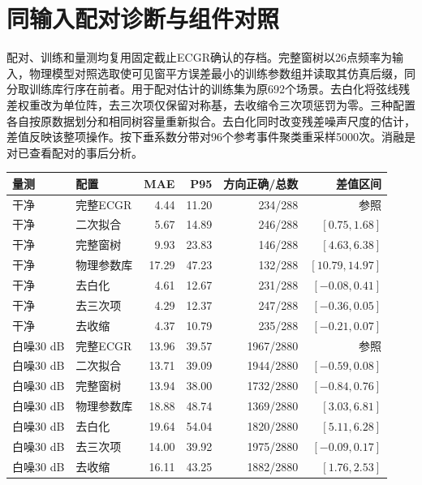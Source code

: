 \documentclass[UTF8,a4paper,11pt]{ctexart}
\begin{document}
\clearpage\section{同输入配对诊断与组件对照}
配对、训练和量测均复用固定截止ECGR确认的存档。完整窗树以26点频率为输入，物理模型对照选取使可见窗平方误差最小的训练参数组并读取其仿真后缀，同分取训练库行序在前者。用于配对估计的训练集为原692个场景。去白化将弦线残差权重改为单位阵，去三次项仅保留对称基，去收缩令三次项惩罚为零。三种配置各自按原数据划分和相同树容量重新拟合。去白化同时改变残差噪声尺度的估计，差值反映该整项操作。按下垂系数分带对96个参考事件聚类重采样5000次。消融是对已查看配对的事后分析。
\begin{center}\small\setlength{\tabcolsep}{4pt}
\label{tab:abl-new}
\begin{tabular}{llrrrr}\toprule
量测 & 配置 & MAE & P95 & 方向正确/总数 & 差值区间 \\ \midrule
干净 & 完整ECGR & 4.44 & 11.20 & 234/288 & 参照 \\
干净 & 二次拟合 & 5.67 & 14.89 & 246/288 & $[0.75, 1.68]$ \\
干净 & 完整窗树 & 9.93 & 23.83 & 146/288 & $[4.63, 6.38]$ \\
干净 & 物理参数库 & 17.29 & 47.23 & 132/288 & $[10.79, 14.97]$ \\
干净 & 去白化 & 4.61 & 12.67 & 231/288 & $[-0.08, 0.41]$ \\
干净 & 去三次项 & 4.29 & 12.37 & 247/288 & $[-0.36, 0.05]$ \\
干净 & 去收缩 & 4.37 & 10.79 & 235/288 & $[-0.21, 0.07]$ \\
白噪30 dB & 完整ECGR & 13.96 & 39.57 & 1967/2880 & 参照 \\
白噪30 dB & 二次拟合 & 13.71 & 39.09 & 1944/2880 & $[-0.59, 0.08]$ \\
白噪30 dB & 完整窗树 & 13.94 & 38.00 & 1732/2880 & $[-0.84, 0.76]$ \\
白噪30 dB & 物理参数库 & 18.88 & 48.74 & 1369/2880 & $[3.03, 6.81]$ \\
白噪30 dB & 去白化 & 19.64 & 54.04 & 1820/2880 & $[5.11, 6.28]$ \\
白噪30 dB & 去三次项 & 14.00 & 39.92 & 1975/2880 & $[-0.09, 0.17]$ \\
白噪30 dB & 去收缩 & 16.11 & 43.25 & 1882/2880 & $[1.76, 2.53]$ \\
\bottomrule\end{tabular}\end{center}
\end{document}
